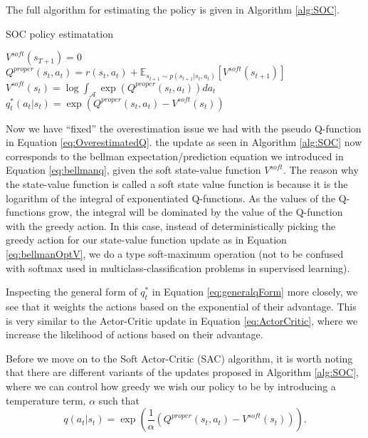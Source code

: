 \documentclass{report}
\numberwithin{equation}{section}
\numberwithin{figure}{section}
\numberwithin{table}{section}
\numberwithin{algorithm}{section}
\begin{document}
The full algorithm for estimating the policy is given in Algorithm 
\ref{alg:SOC}.

\begin{algorithm}
  \caption{SOC policy estimatation}
  \label{alg:SOC}
  \begin{algorithmic}
    \State $V^{soft}(s_{T+1})=0$
    \State $Q^{proper}(s_t, a_t)=r(s_t, a_t) + \mathbb{E}_{s_{t+1}\sim p(s_{t+1}|s_t,a_t)}[V^{soft}(s_{t+1})]$
    \State $V^{soft}(s_t)=\log\int_{\mathcal{A}}\exp(Q^{proper}(s_t,a_t))da_t$
    \State $q_t^*(a_t|s_t)=\exp(Q^{proper}(s_t,a_t)-V^{soft}(s_t))$
    \EndFor
  \end{algorithmic}
\end{algorithm}

Now we have ``fixed'' the overestimation issue we had with the 
pseudo Q-function in Equation \ref{eq:OverestimatedQ}. the update 
as seen in Algorithm \ref{alg:SOC} now corresponds to the 
bellman expectation/prediction equation we introduced
in Equation \ref{eq:bellmanq}, given the soft state-value function 
$V^{soft}$. The reason why the state-value function is called a 
soft state value function is because it is the logarithm 
of the integral of exponentiated Q-functions. As the values 
of the Q-functions grow, the integral will be dominated by 
the value of the Q-function with the greedy action. In this 
case, instead of deterministically picking the greedy action 
for our state-value function update as in Equation \ref{eq:bellmanOptV}, 
we do a type soft-maximum operation (not to be confused with softmax 
used in multiclass-classification problems in supervised learning).

Inspecting the general form of $q^*_t$ in Equation \ref{eq:generalqForm}
more closely, we see that it weights the actions based on the
exponential of their advantage. This is very similar to the 
Actor-Critic update in Equation \ref{eq:ActorCritic}, where 
we increase the 
likelihood of actions based on their advantage.

Before we move on to the Soft Actor-Critic (SAC) \citep{SAC2} 
algorithm, it is worth noting that there are different variants of 
the updates proposed in Algorithm \ref{alg:SOC}, where 
we can control how greedy we wish our policy to be by 
introducing a temperature term, $\alpha$ such that 
\begin{equation*}
  q(a_t|s_t)=\exp(\frac{1}{\alpha}(Q^{proper}(s_t,a_t)-V^{soft}(s_t))).  
\end{equation*}
\end{document}

